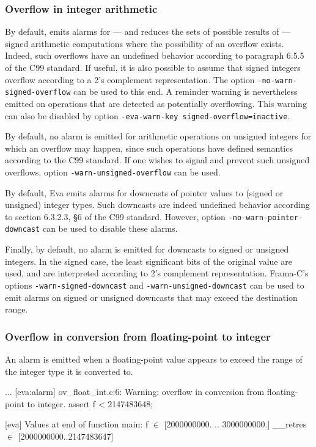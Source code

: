 \documentclass{frama-c-book}
\newcommand{\isoc}{\textsf{C99}}
\begin{document}
\subsubsection{Overflow in integer arithmetic}

By default, \Eva{} emits alarms for --- and reduces the
sets of possible results of --- signed arithmetic computations where
the possibility of an overflow exists. Indeed,
such overflows have an undefined behavior according to
paragraph 6.5.5 of the \isoc{} standard.
%
If useful, it is also possible to assume that signed integers overflow
according to a 2's complement representation. The option
\lstinline|-no-warn-signed-overflow| can be used to this end. A
reminder warning is nevertheless emitted on operations that are detected
as potentially overflowing. This warning can also be disabled by option
\lstinline|-eva-warn-key signed-overflow=inactive|.

By default, no alarm is emitted for arithmetic operations on unsigned integers
for which an overflow may happen, since such operations have
defined semantics according to the \isoc{} standard.
If one wishes to signal and prevent such unsigned overflows,
option \verb+-warn-unsigned-overflow+ can be used.

By default, Eva emits alarms for downcasts of pointer values to (signed
or unsigned) integer types. Such downcasts are indeed  undefined behavior
according to section 6.3.2.3, §6 of the \isoc{} standard.
However, option \lstinline|-no-warn-pointer-downcast| can be used to disable
these alarms.

Finally, by default, no alarm is emitted for downcasts to signed or unsigned
integers. In the signed case, the least significant bits
of the original value are used, and are interpreted according
to 2's complement representation.
Frama-C's options \lstinline|-warn-signed-downcast| and
\lstinline|-warn-unsigned-downcast| can be used to emit alarms on signed
or unsigned downcasts that may exceed the destination range.


\subsubsection{Overflow in conversion from floating-point to integer}
An alarm is emitted when a floating-point value appears to exceed the
range of the integer type it is converted to.

\begin{logs}
...
[eva:alarm] ov_float_int.c:6: Warning: overflow in conversion from floating-point
 to integer. assert f < 2147483648;

[eva] Values at end of function main:
f $\in$ [2000000000. .. 3000000000.]
__retres $\in$ [2000000000..2147483647]
\end{logs}
\end{document}
